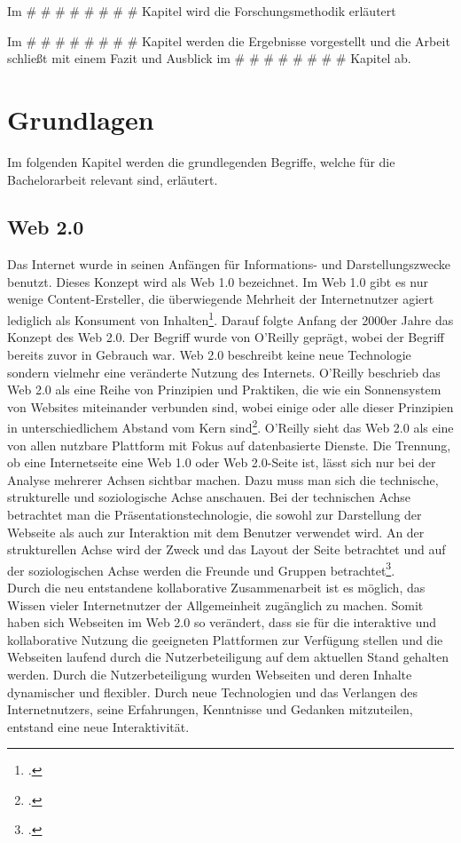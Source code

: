 Im \# \# \# \# \# \# \# \# Kapitel wird die Forschungsmethodik erläutert\par

Im \# \# \# \# \# \# \# \# Kapitel werden die Ergebnisse vorgestellt und die Arbeit schließt mit einem Fazit und Ausblick im \# \# \# \# \# \# \# \# Kapitel ab.

\chapter{Grundlagen}
\label{ch:Grundlagen}

Im folgenden Kapitel werden die grundlegenden Begriffe, welche für die Bachelorarbeit relevant sind, erläutert. 

\section{Web 2.0}
\label{web2.0}

Das Internet wurde in seinen Anfängen für Informations- und Darstellungszwecke benutzt. Dieses Konzept wird als Web 1.0 bezeichnet. Im Web 1.0 gibt es nur wenige Content-Ersteller, die überwiegende Mehrheit der Internetnutzer agiert lediglich als Konsument von Inhalten\footcite{unterschiedWeb1u2}. Darauf folgte Anfang der 2000er Jahre das Konzept des Web 2.0. Der Begriff wurde von O'Reilly geprägt, wobei der Begriff bereits zuvor in Gebrauch war. Web 2.0 beschreibt keine neue Technologie sondern vielmehr eine veränderte Nutzung des Internets. O'Reilly beschrieb das Web 2.0 als eine Reihe von Prinzipien und Praktiken, die wie ein Sonnensystem von Websites miteinander verbunden sind, wobei einige oder alle dieser Prinzipien in unterschiedlichem Abstand vom Kern sind\footcite{oreilly}. O'Reilly sieht das Web 2.0 als eine von allen nutzbare Plattform mit Fokus auf datenbasierte Dienste.
Die Trennung, ob eine Internetseite eine Web 1.0 oder Web 2.0-Seite ist, lässt sich nur bei der Analyse mehrerer Achsen sichtbar machen. Dazu muss man sich die technische, strukturelle und soziologische Achse anschauen. Bei der technischen Achse betrachtet man die Präsentationstechnologie, die sowohl zur Darstellung der Webseite als auch zur Interaktion mit dem Benutzer verwendet wird. An der strukturellen Achse wird der Zweck und das Layout der Seite betrachtet und auf der soziologischen Achse werden die Freunde und Gruppen betrachtet\footcite{unterschiedWeb1u2}. \\
Durch die neu entstandene kollaborative Zusammenarbeit ist es möglich, das Wissen vieler Internetnutzer der Allgemeinheit zugänglich zu machen. Somit haben sich Webseiten im Web 2.0 so verändert, dass sie für die interaktive und kollaborative Nutzung die geeigneten Plattformen zur Verfügung stellen und die Webseiten laufend durch die Nutzerbeteiligung auf dem aktuellen Stand gehalten werden. Durch die Nutzerbeteiligung wurden Webseiten und deren Inhalte dynamischer und flexibler.
Durch neue Technologien und das Verlangen des Internetnutzers, seine Erfahrungen, Kenntnisse und Gedanken mitzuteilen, entstand eine neue Interaktivität.


